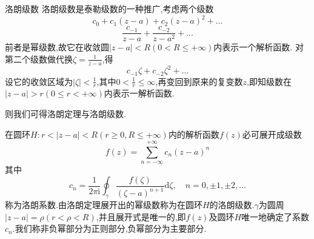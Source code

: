 \documentclass[zihao=-4,a4paper]{ctexart}
\begin{document}
\begin{mdefinition}{洛朗级数}
	洛朗级数是泰勒级数的一种推广,考虑两个级数
	\begin{equation*}
		{c}_{0} + {c}_{1} \left( {z} - {a} \right) + {c}_{2} {\left( {z} - {a} \right)}^{2}+ ... 
	\end{equation*}
	\begin{equation*}
		\frac{ {c}_{-1} }{ {z} - {a} } + \frac{ {c}_{-2} }{ { {z} - {a} }^{2} } + ...
	\end{equation*}
	前者是幂级数,故它在收敛圆$\left| {z} - {a} \right| < R \left( 0 {<} R {\leqslant} + {\infty} \right)$内表示一个解析函数.
	对第二个级数做代换${\zeta} = \frac{1}{ {z} - {a} }$,得
	\begin{equation*}
		{c}_{-1} {\zeta} + {c}_{-2} {\zeta}^{2} + ...
	\end{equation*}
	设它的收敛区域为$\left| {\zeta} \right| < \frac{1}{r}$,其中$0 < \frac{1}{r} {\leqslant} {\infty}$,再变回到原来的复变数$z$,即知级数在$\left| {z} - {a} \right| > {r} \left( {0} {\leqslant} {r} < + {\infty}\right)$内表示一解析函数.

	则我们可得洛朗定理与洛朗级数.

	在圆环${H} : {r} < {\left| {z} - {a} \right|} < {R} \left( {r} {\geqslant} 0 , {R} {\leqslant} + {\infty} \right)$内的解析函数$f \left( {z} \right)$必可展开成级数
	\begin{equation}
		{f} \left( {z} \right) = \sum^{ + {\infty} }_{ n = - {\infty} } {c}_{n} { \left( {z} - {a} \right) }^{n}
	\end{equation}
	其中
	\begin{equation}
		{c}_{n} = \frac{1}{2 {\pi} \text{i}} \oint_{\gamma} \frac{{f} \left( {\zeta} \right)}{{\left( {\zeta} - {a} \right)}^{n+1}} \text{d}{\zeta}, {\quad} n = 0 , {\pm} 1 , {\pm} 2 , ...
	\end{equation}
	称为洛朗系数.由洛朗定理展开出的幂级数称为在圆环$H$的洛朗级数.$\gamma$为圆周$\left| {z} - {a} \right| = {\rho} \left( {r} {<} {\rho} {<} {R} \right)$,并且展开式是唯一的,即$f \left( {z} \right)$及圆环$H$唯一地确定了系数${c}_{n}$.我们称非负幂部分为正则部分,负幂部分为主要部分.
\end{mdefinition}
\end{document}
